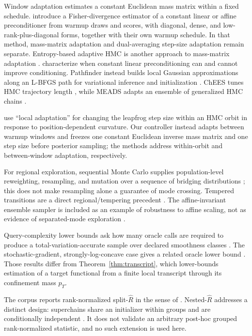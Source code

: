 \documentclass[11pt]{article}
\theoremstyle{plain}
\theoremstyle{definition}
\theoremstyle{remark}
\newcommand{\Rhat}{\widehat R}
\begin{document}
Window adaptation \citep{carpenter2017stan} estimates a constant Euclidean mass
matrix within a fixed schedule. \citet{seyboldt2026preconditioning} introduce a
Fisher-divergence estimator of a constant linear or affine preconditioner from
warmup draws and scores, with diagonal, dense, and
low-rank-plus-diagonal forms, together with their own warmup schedule. In that
method, mass-matrix adaptation and dual-averaging step-size adaptation remain
separate. Entropy-based adaptive HMC is another approach to mass-matrix
adaptation \citep{hirt2021entropy}.
\citet{hird2025preconditioning} characterize when constant linear
preconditioning can and cannot improve conditioning. Pathfinder instead builds
local Gaussian approximations along an L-BFGS path for variational inference
and initialization \citep{zhang2022pathfinder}. ChEES tunes HMC trajectory
length \citep{hoffman2021chees}, while MEADS adapts an ensemble of generalized
HMC chains \citep{hoffman2022meads}.

\citet{bourabee2025walnuts} use ``local adaptation'' for changing the leapfrog
step size within an HMC orbit in response to position-dependent curvature. Our
controller instead adapts between warmup windows and freezes one constant
Euclidean inverse mass matrix and one step size before posterior sampling; the
methods address within-orbit and between-window adaptation, respectively.

For regional exploration, sequential Monte Carlo supplies population-level
reweighting, resampling, and mutation over a sequence of bridging distributions
\citep{delmoral2006smc}; this does not make resampling alone a guarantee of
mode crossing. Tempered transitions are a direct regional/tempering precedent
\citep{neal1996tempered}.
The affine-invariant ensemble sampler is included as an example of robustness
to affine scaling, not as evidence of separated-mode exploration
\citep{goodman2010ensemble}.

Query-complexity lower bounds ask how many oracle calls are required to produce
a total-variation-accurate sample over declared smoothness classes
\citep{chewi2022query,he2025query}. The stochastic-gradient,
strongly-log-concave case gives a related oracle lower bound
\citep{chatterji2022oracle}. Those results differ from
Theorem~\ref{thm:transcript}, which lower-bounds estimation of a target
functional from a finite local transcript through its confinement mass $p_T$.

The corpus reports rank-normalized split-$\Rhat$ in the sense of
\citet{vehtari2021rank}. Nested-$\Rhat$ addresses a distinct design:
superchains share an initializer within groups and are conditionally
independent \citep{margossian2025nested}. It does not validate an arbitrary
post-hoc grouped rank-normalized statistic, and no such extension is used here.
\end{document}
